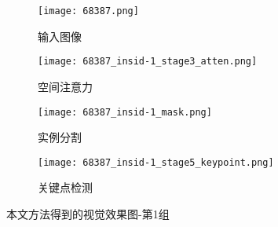 \begin{figure}[H]
\begin{minipage}[t]{\linewidth}
		\vskip5pt
		\begin{subfigure}[b]{0.23\linewidth}
			\texttt{[image: 68387.png]}
			\caption{输入图像}
		\end{subfigure}
		\begin{subfigure}[b]{0.23\linewidth}
			\texttt{[image: 68387\_insid-1\_stage3\_atten.png]}
			\caption{空间注意力}
		\end{subfigure}
		\begin{subfigure}[b]{0.23\linewidth}
			\texttt{[image: 68387\_insid-1\_mask.png]}
			\caption{实例分割}
		\end{subfigure}
		\begin{subfigure}[b]{0.23\linewidth}
			\texttt{[image: 68387\_insid-1\_stage5\_keypoint.png]}
			\caption{关键点检测}
		\end{subfigure}
	\end{minipage}
	\caption{本文方法得到的视觉效果图-第1组}
	\label{fig:megavis_a}
\end{figure}

